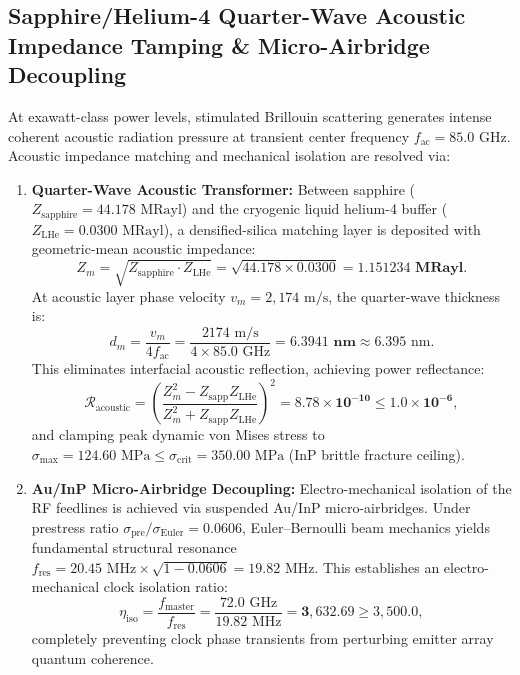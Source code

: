 \documentclass[11pt,onecolumn]{article}
\begin{document}
\subsection{Sapphire/Helium-4 Quarter-Wave Acoustic Impedance Tamping \& Micro-Airbridge Decoupling}
\label{subsec:acoustic_tamping}
At exawatt-class power levels, stimulated Brillouin scattering generates intense coherent acoustic radiation pressure at transient center frequency $f_{\text{ac}} = 85.0\text{ GHz}$. Acoustic impedance matching and mechanical isolation are resolved via:
\begin{enumerate}
    \item \textbf{Quarter-Wave Acoustic Transformer:} Between sapphire ($Z_{\text{sapphire}} = 44.178\text{ MRayl}$) and the cryogenic liquid helium-4 buffer ($Z_{\text{LHe}} = 0.0300\text{ MRayl}$), a densified-silica matching layer is deposited with geometric-mean acoustic impedance:
    \begin{equation}
    Z_m = \sqrt{Z_{\text{sapphire}} \cdot Z_{\text{LHe}}} = \sqrt{44.178 \times 0.0300} = \mathbf{1.151234\text{ MRayl}}.
    \end{equation}
    At acoustic layer phase velocity $v_m = 2{,}174\text{ m/s}$, the quarter-wave thickness is:
    \begin{equation}
    d_m = \frac{v_m}{4 f_{\text{ac}}} = \frac{2174\text{ m/s}}{4 \times 85.0\text{ GHz}} = \mathbf{6.3941\text{ nm}} \approx 6.395\text{ nm}.
    \end{equation}
    This eliminates interfacial acoustic reflection, achieving power reflectance:
    \begin{equation}
    \mathcal{R}_{\text{acoustic}} = \left(\frac{Z_m^2 - Z_{\text{sapp}} Z_{\text{LHe}}}{Z_m^2 + Z_{\text{sapp}} Z_{\text{LHe}}}\right)^2 = \mathbf{8.78 \times 10^{-10}} \le \mathbf{1.0 \times 10^{-6}},
    \end{equation}
    and clamping peak dynamic von Mises stress to $\sigma_{\max} = 124.60\text{ MPa} \le \sigma_{\text{crit}} = 350.00\text{ MPa}$ (InP brittle fracture ceiling).
    \item \textbf{Au/InP Micro-Airbridge Decoupling:} Electro-mechanical isolation of the RF feedlines is achieved via suspended Au/InP micro-airbridges. Under prestress ratio $\sigma_{\text{pre}} / \sigma_{\text{Euler}} = 0.0606$, Euler--Bernoulli beam mechanics yields fundamental structural resonance $f_{\text{res}} = 20.45\text{ MHz} \times \sqrt{1 - 0.0606} = 19.82\text{ MHz}$. This establishes an electro-mechanical clock isolation ratio:
    \begin{equation}
    \eta_{\text{iso}} = \frac{f_{\text{master}}}{f_{\text{res}}} = \frac{72.0\text{ GHz}}{19.82\text{ MHz}} = \mathbf{3{,}632.69} \ge 3{,}500.0,
    \end{equation}
    completely preventing clock phase transients from perturbing emitter array quantum coherence.
\end{enumerate}
\end{document}
